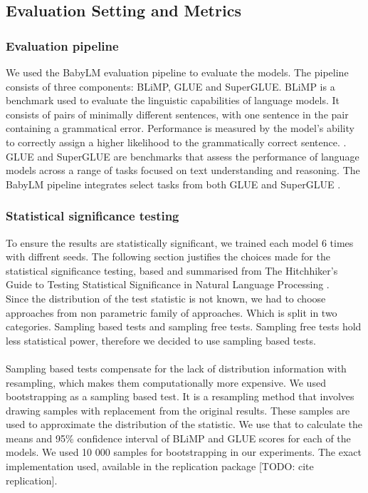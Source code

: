 \subsection{Evaluation Setting and Metrics}
\subsubsection{Evaluation pipeline\protect\footnotemark[4] \protect\footnotemark[5]}
We used the BabyLM evaluation pipeline \cite{Warstadt2023} to evaluate the models. The pipeline consists of three components: BLiMP, GLUE and SuperGLUE. BLiMP is a benchmark used to evaluate the linguistic capabilities of language models. It consists of pairs of minimally different sentences, with one sentence in the pair containing a grammatical error. Performance is measured by the model's ability to correctly assign a higher likelihood to the grammatically correct sentence. \cite{Warstadt2023blimp} \cite{warstadt-etal-2023-findings}. GLUE and SuperGLUE are benchmarks that assess the performance of language models across a range of tasks focused on text understanding and reasoning. The BabyLM pipeline integrates select tasks from both GLUE and SuperGLUE \cite{Wang2019} \cite{Wang2020}.

\subsubsection{Statistical significance testing}
To ensure the results are statistically significant, we trained each model 6 times with diffrent seeds. The following section justifies the choices made for the statistical significance testing, based and summarised from The Hitchhiker’s Guide to Testing Statistical Significance in Natural Language Processing \cite{dror2018hitchhikers}. \\
Since the distribution of the test statistic is not known, we had to choose approaches from non parametric family of approaches. Which is split in two categories. Sampling based tests and sampling free tests. Sampling free tests hold less statistical power, therefore we decided to use sampling based tests.
\\\\
Sampling based tests compensate for the lack of distribution information with resampling, which makes them computationally more expensive. We used bootstrapping as a sampling based test. It is a resampling method that involves drawing samples with replacement from the original results. These samples are used to approximate the distribution of the statistic. We use that to calculate the means and 95\% confidence interval of BLiMP and GLUE scores for each of the models. We used 10 000 samples for bootstrapping in our experiments. The exact implementation used, available in the replication package [TODO: cite replication].

